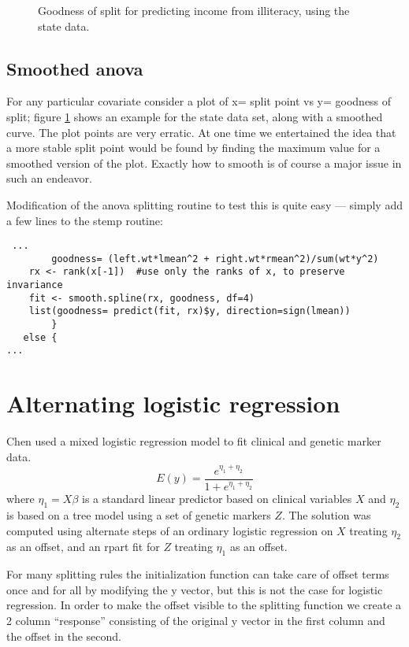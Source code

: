 \Rcodeplaceholder{}

\begin{figure}
  \caption{Goodness of split for predicting income from illiteracy, using
    the state data.}
  \label{fig:state}
\end{figure}

\Rcodeplaceholder{}

\subsection{Smoothed anova}
For any particular covariate consider a plot of
x= split point vs y= goodness of split;
figure \ref{fig:state} shows an example for the state data
set, along with a smoothed curve.
The plot points are very erratic.
At one time we entertained the idea that a more stable split
point would be found by finding the maximum value for a
smoothed version of the plot.
Exactly how to smooth is of course a major issue in such an
endeavor.

Modification of the anova splitting routine to test this
is quite easy --- simply add a few lines to the stemp routine:
\begin{verbatim}
 ...
        goodness= (left.wt*lmean^2 + right.wt*rmean^2)/sum(wt*y^2)
    rx <- rank(x[-1])  #use only the ranks of x, to preserve invariance
    fit <- smooth.spline(rx, goodness, df=4)
    list(goodness= predict(fit, rx)$y, direction=sign(lmean))
        }
   else {
...
\end{verbatim}

\section{Alternating logistic regression}
Chen \cite{Chen07} used a mixed logistic regression model to
fit clinical and genetic marker data.
\begin{equation}
  E(y) = \frac{e^{\eta_1 + \eta_2}}{1+e^{\eta_1 + \eta_2}}
  \end{equation}
where $\eta_1 = X\beta$ is a standard linear predictor based
on clinical variables $X$ and $\eta_2$ is based on a tree model
using a set of genetic markers $Z$.
The solution was computed using alternate steps of an ordinary
logistic regression on $X$ treating $\eta_2$ as an offset,
and an rpart fit for $Z$ treating $\eta_1$ as an offset.

For many splitting rules the initialization function can take
care of offset terms once and for all by modifying the y
vector, but this is not the case for logistic regression.
In order to make the offset visible to the splitting function
we create a 2 column ``response'' consisting of the original
y vector in the first column and the offset in the second.

